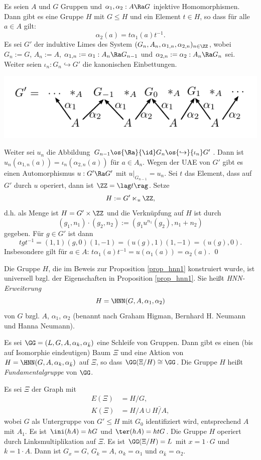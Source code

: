 \PROP\label{prop_hnn1}
Es seien $A$ und $G$ Gruppen und $\alpha_1,\alpha_2:A\Ra G$
injektive Homomorphismen.
Dann gibt es eine Gruppe $H$ mit $G\leq H$ und ein Element $t\in H$,
so dass für alle $a\in A$ gilt:
\[
\alpha_2(a) = t \alpha_1(a) t^{-1}.
\]
\bew Es sei $G'$ der induktive Limes des System
$(G_n, A_n, \alpha_{1,n}, \alpha_{2,n})_{n\in \ZZ}$,
wobei $G_n:=G$, $A_n:=A$, $\alpha_{1,n}:=\alpha_1:A_n\Ra G_{n-1}$
und $\alpha_{2,n}:=\alpha_2:A_n\Ra G_n$ sei.
Weiter seien $\iota_n:G_n \hookrightarrow G'$ die kanonischen Einbettungen.
\begin{center}
	\includegraphics{grugraImages/Glimes}
\end{center}
Weiter sei $u_n$ die Abbildung
$G_{n-1}\os{\Ra}{\id} G_n \os{\hookrightarrow}{\iota_n} G'$. Dann ist
$u_n(\alpha_{1,n}(a))=\iota_n(\alpha_{2,n}(a))$ für $a\in A_n$.
Wegen der UAE von $G'$ gibt es einen Automorphismus
$u:G'\Ra G'$ mit $u|_{G_{n-1}}=u_n$.
Sei $t$ das Element, dass auf $G'$ durch $u$ operiert, dann ist $\ZZ=\lag t \rag$.
Setze
\[
H := G' \ltimes_u \ZZ,
\]
d.h. als Menge ist $H=G'\times \ZZ$ und die Verknüpfung auf $H$
ist durch
\[
(g_1, n_1) \cdot (g_2, n_2) := (g_1 u^{n_1}(g_2), n_1+n_2)
\]
gegeben.
Für $g\in G'$ ist dann
\[
t g t^{-1} = (1,1)(g,0)(1,-1)
= (u(g),1)(1,-1) = (u(g),0).
\]
Insbesondere gilt für $a\in A$:
$t \alpha_1(a) t^{-1} = u(\alpha_1(a)) = \alpha_2(a)$.
\qed

\DB Die Gruppe $H$, die im Beweis zur Proposition \ref{prop_hnn1}
konstruiert wurde, ist universell bzgl. der Eigenschaften
in Proposition \ref{prop_hnn1}.
Sie heißt \emph{HNN-Erweiterung}
\[
H = \HNN(G,A,\alpha_1,\alpha_2)
\]
von $G$ bzgl. $A$, $\alpha_1$, $\alpha_2$
(benannt nach Graham Higman, Bernhard H. Neumann und Hanna Neumann).

\PROP \label{prop_hnn2}
Es sei $\GG=(L,G,A,\alpha_k,\alpha_{\bar{k}})$ eine Schleife von
Gruppen. Dann gibt es einen (bis auf Isomorphie eindeutigen)
Baum $\Xi$ und eine Aktion von $H=\HNN(G,A,\alpha_k,\alpha_{\bar{k}})$
auf $\Xi$, so dass $\GG(\Xi/H)\cong \GG$.
Die Gruppe $H$ heißt \emph{Fundamentalgruppe}
von $\GG$.

\bew Es sei $\Xi$ der Graph mit
\begin{align*}
E(\Xi) &= H/G, \\
K(\Xi) &= H/A \cup \bar{H/A},
\end{align*}
wobei $G$ als Untergruppe von $G'\leq H$ mit $G_0$ identifiziert wird,
entsprechend $A$ mit $A_1$.
Es ist $\ini(hA)=hG$ und $\ter(hA)=htG$.
Die Gruppe $H$ operiert durch Linksmultiplikation auf $\Xi$.
Es ist $\GG(\Xi/H)=L$ mit $x=1\cdot G$ und $k=1\cdot A$.
Dann ist $G_x=G$, $G_k=A$, $\alpha_k=\alpha_1$ und
$\alpha_{\bar{k}}=\alpha_2$.

